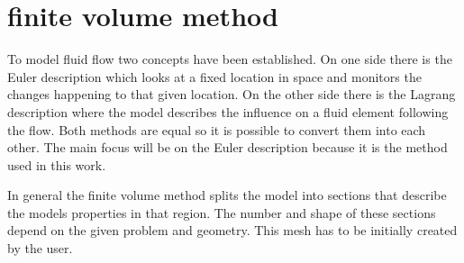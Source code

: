 \documentclass[../thesis.tex]{subfiles}
\begin{document}
\section{finite volume method}

To model  fluid flow two concepts have been established. On one side there is the Euler description which looks at a fixed location in space and monitors the changes happening to that given location. On the other side there is the Lagrang description where the model describes the influence on a fluid element following the flow. Both methods are equal so it is possible to convert them into each other. The main focus will be on the Euler description because it is the method used in this work.

In general the finite volume method splits the model into sections that describe the models properties in that region. The number and shape of these sections depend on the given problem and geometry. This mesh has to be initially created by the user.    
\end{document}
